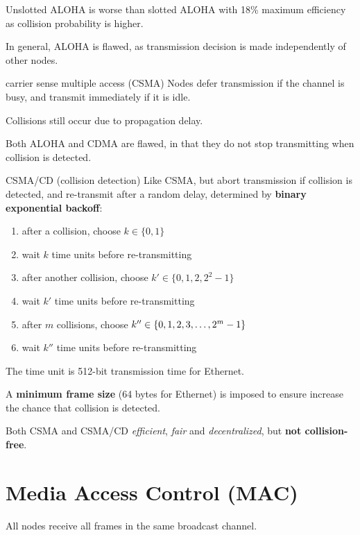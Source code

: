 Unslotted ALOHA is worse than slotted ALOHA with 18\% maximum efficiency as collision probability
is higher.

In general, ALOHA is flawed, as transmission decision is made independently of other nodes.

\begin{defn}{carrier sense multiple access (CSMA)}
    Nodes defer transmission if the channel is busy, and transmit immediately if it is idle.
\end{defn}

Collisions still occur due to propagation delay.

Both ALOHA and CDMA are flawed, in that they do not stop transmitting when collision is detected.

\begin{defn}{CSMA/CD (collision detection)}
    Like CSMA, but abort transmission if collision is detected, and re-transmit after a random delay,
    determined by \textbf{binary exponential backoff}:

    \begin{enumerate}
        \item after a collision, choose $k \in \{0, 1\}$
        \item wait $k$ time units before re-transmitting
        \item after another collision, choose $k' \in \{0, 1, 2, 2^2 - 1\}$
        \item wait $k'$ time units before re-transmitting
        \item after $m$ collisions, choose $k'' \in \{0, 1, 2, 3, \dots, \\ 2^m - 1\}$
        \item wait $k''$ time units before re-transmitting
    \end{enumerate}

    The time unit is 512-bit transmission time for Ethernet.

    A \textbf{minimum frame size} (64 bytes for Ethernet) is imposed to ensure increase
    the chance that collision is detected.
\end{defn}

Both CSMA and CSMA/CD \textit{efficient}, \textit{fair} and \textit{decentralized},
but \textbf{not collision-free}.


\section{Media Access Control (MAC)}
All nodes receive all frames in the same broadcast channel.

